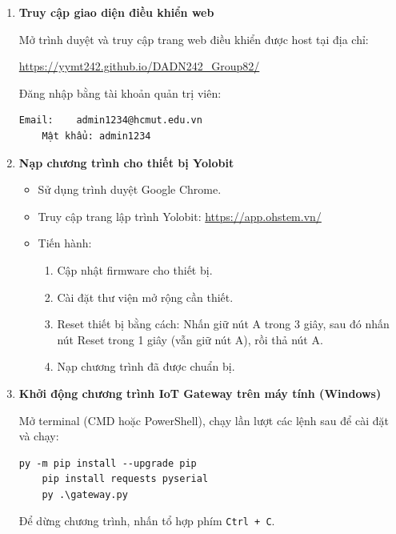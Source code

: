 \begin{enumerate}[label=\textbf{Bước \arabic*.}, leftmargin=1.5cm]

    \item \textbf{Truy cập giao diện điều khiển web}

          Mở trình duyệt và truy cập trang web điều khiển được host tại địa chỉ:
          \begin{center}
              \url{https://yymt242.github.io/DADN242_Group82/}
          \end{center}

          Đăng nhập bằng tài khoản quản trị viên:

          \begin{lstlisting}[style=pythonstyle]
    Email:    admin1234@hcmut.edu.vn
    Mật khẩu: admin1234
    \end{lstlisting}

    \item \textbf{Nạp chương trình cho thiết bị Yolobit}

          \begin{itemize}
              \item Sử dụng trình duyệt Google Chrome.
              \item Truy cập trang lập trình Yolobit: \url{https://app.ohstem.vn/}
              \item Tiến hành:
                    \begin{enumerate}
                        \item Cập nhật firmware cho thiết bị.
                        \item Cài đặt thư viện mở rộng cần thiết.
                        \item Reset thiết bị bằng cách: Nhấn giữ nút A trong 3 giây, sau đó nhấn nút Reset trong 1 giây (vẫn giữ nút A), rồi thả nút A.
                        \item Nạp chương trình đã được chuẩn bị.
                    \end{enumerate}
          \end{itemize}

    \item \textbf{Khởi động chương trình IoT Gateway trên máy tính (Windows)}

          Mở terminal (CMD hoặc PowerShell), chạy lần lượt các lệnh sau để cài đặt và chạy:

          \begin{lstlisting}[style=pythonstyle]
    py -m pip install --upgrade pip
    pip install requests pyserial
    py .\gateway.py
    \end{lstlisting}

          Để dừng chương trình, nhấn tổ hợp phím \texttt{Ctrl + C}.

\end{enumerate}


